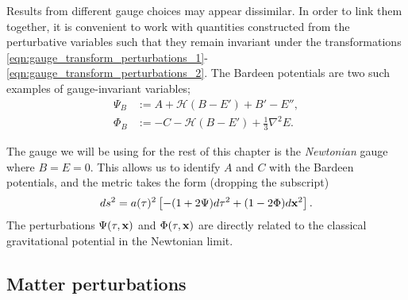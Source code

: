 Results from different gauge choices may appear dissimilar. In order to link them together, it is convenient to work with quantities constructed from the perturbative variables such that they remain invariant under the transformations \eqref{eqn:gauge_transform_perturbations_1}-\eqref{eqn:gauge_transform_perturbations_2}. The Bardeen potentials are two such examples of gauge-invariant variables;
\begin{align}
	\Psi_B &:= A + \mathcal{H}(B-E') + B' - E'', \\
	\Phi_B &:= -C - \mathcal{H}(B-E') + \frac{1}{3}\nabla^2 E.
\end{align}

The gauge we will be using for the rest of this chapter is the \textit{Newtonian} gauge where $B=E=0$. This allows us to identify $A$ and $C$ with the Bardeen potentials, and the metric takes the form (dropping the subscript)
\begin{align}
	ds^2 = a(\tau)^2 \left[ -(1 + 2\Psi) d\tau^2 + (1-2\Phi) d\mathbf{x}^2  \right]. \label{eqn:perturbed_metric_newtonian_gauge}
\end{align}
The perturbations $\Psi(\tau,\mathbf{x})$ and $\Phi(\tau,\mathbf{x})$ are directly related to the classical gravitational potential in the Newtonian limit.


\subsection{Matter perturbations}

